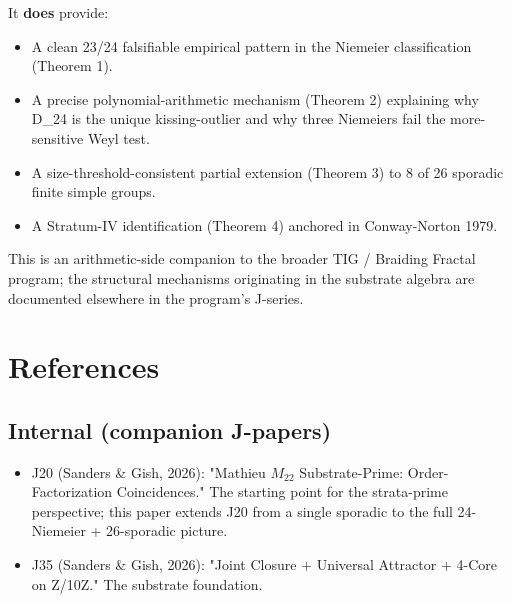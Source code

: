 \documentclass[11pt,reqno]{amsart}
\theoremstyle{plain}
\theoremstyle{definition}
\begin{document}
It \textbf{does} provide:
\begin{itemize}
\item A clean 23/24 falsifiable empirical pattern in the Niemeier classification (Theorem 1).
\item A precise polynomial-arithmetic mechanism (Theorem 2) explaining why D_24 is the unique kissing-outlier and why three Niemeiers fail the more-sensitive Weyl test.
\item A size-threshold-consistent partial extension (Theorem 3) to 8 of 26 sporadic finite simple groups.
\item A Stratum-IV identification (Theorem 4) anchored in Conway-Norton 1979.
\end{itemize}

This is an arithmetic-side companion to the broader TIG / Braiding Fractal program; the structural mechanisms originating in the substrate algebra are documented elsewhere in the program's J-series.

\section{References}

\subsection{Internal (companion J-papers)}
\begin{itemize}
\item J20 (Sanders & Gish, 2026): "Mathieu $M_{22}$ Substrate-Prime: Order-Factorization Coincidences." The starting point for the strata-prime perspective; this paper extends J20 from a single sporadic to the full 24-Niemeier + 26-sporadic picture.
\item J35 (Sanders \& Gish, 2026): "Joint Closure + Universal Attractor + 4-Core on Z/10Z." The substrate foundation.
\end{itemize}
\end{document}
